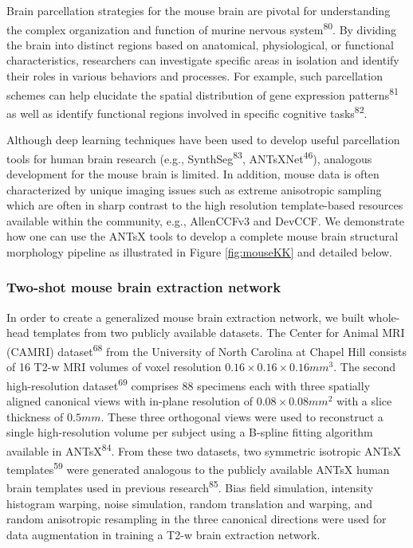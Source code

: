 \documentclass[
  12pt,
]{article}
\begin{document}
Brain parcellation strategies for the mouse brain are pivotal for
understanding the complex organization and function of murine nervous
system\textsuperscript{80}. By dividing the brain into distinct regions
based on anatomical, physiological, or functional characteristics,
researchers can investigate specific areas in isolation and identify
their roles in various behaviors and processes. For example, such
parcellation schemes can help elucidate the spatial distribution of gene
expression patterns\textsuperscript{81} as well as identify functional
regions involved in specific cognitive tasks\textsuperscript{82}.

Although deep learning techniques have been used to develop useful
parcellation tools for human brain research (e.g.,
SynthSeg\textsuperscript{83}, ANTsXNet\textsuperscript{46}), analogous
development for the mouse brain is limited. In addition, mouse data is
often characterized by unique imaging issues such as extreme anisotropic
sampling which are often in sharp contrast to the high resolution
template-based resources available within the community, e.g.,
AllenCCFv3 and DevCCF. We demonstrate how one can use the ANTsX tools to
develop a complete mouse brain structural morphology pipeline as
illustrated in Figure \ref{fig:mouseKK} and detailed below.

\subsubsection{Two-shot mouse brain extraction
network}\label{two-shot-mouse-brain-extraction-network}

In order to create a generalized mouse brain extraction network, we
built whole-head templates from two publicly available datasets. The
Center for Animal MRI (CAMRI) dataset\textsuperscript{68} from the
University of North Carolina at Chapel Hill consists of 16 T2-w MRI
volumes of voxel resolution \(0.16
\times 0.16 \times 0.16 mm^3\). The second high-resolution
dataset\textsuperscript{69} comprises 88 specimens each with three
spatially aligned canonical views with in-plane resolution of
\(0.08 \times 0.08 mm^2\) with a slice thickness of \(0.5 mm\). These
three orthogonal views were used to reconstruct a single high-resolution
volume per subject using a B-spline fitting algorithm available in
ANTsX\textsuperscript{84}. From these two datasets, two symmetric
isotropic ANTsX templates\textsuperscript{59} were generated analogous
to the publicly available ANTsX human brain templates used in previous
research\textsuperscript{85}. Bias field simulation, intensity histogram
warping, noise simulation, random translation and warping, and random
anisotropic resampling in the three canonical directions were used for
data augmentation in training a T2-w brain extraction network.
\end{document}
